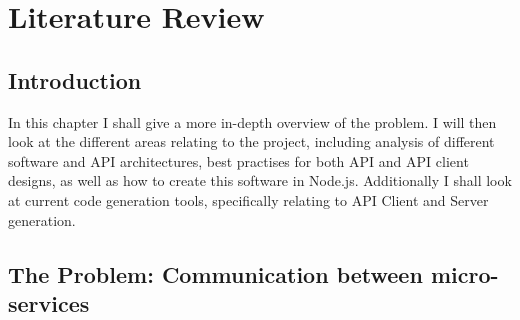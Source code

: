 \chapter{Literature Review}

\section{Introduction}
In this chapter I shall give a more in-depth overview of the problem. I will then look at the different areas relating to the project, including analysis of different software and API architectures, best practises for both API and API client designs, as well as how to create this software in Node.js. Additionally I shall look at current code generation tools, specifically relating to API Client and Server generation.

\section{The Problem: Communication between micro-services}

